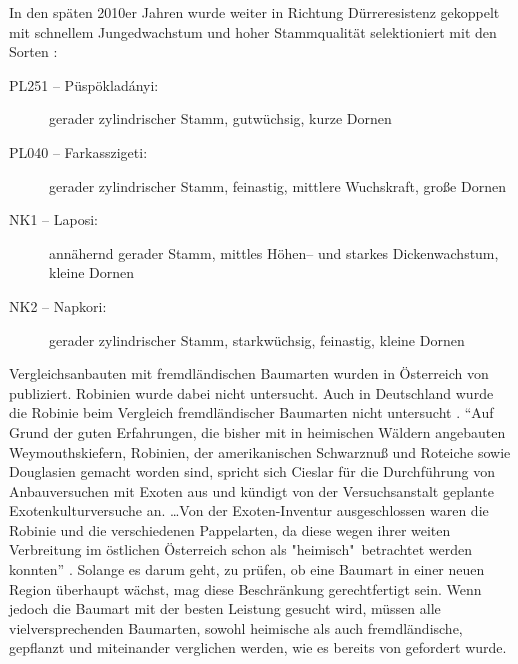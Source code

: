 \documentclass[twocolumn]{scrartcl}
\begin{document}
In den späten 2010er Jahren wurde weiter in Richtung Dürreresistenz
gekoppelt mit schnellem Jungedwachstum und hoher Stammqualität
selektioniert mit den Sorten \citep{abri2023robinieUngarn,abri2024dis}:
\begin{description}
  \item[PL251 -- Püspökladányi:] gerader zylindrischer Stamm, gutwüchsig, kurze Dornen
  \item[PL040 -- Farkasszigeti:] gerader zylindrischer Stamm, feinastig, mittlere Wuchskraft, große Dornen
  \item[NK1 -- Laposi:] annähernd gerader Stamm, mittles Höhen-- und starkes Dickenwachstum, kleine Dornen
  \item[NK2 -- Napkori:] gerader zylindrischer Stamm, starkwüchsig,
feinastig, kleine Dornen
\end{description}

Vergleichsanbauten mit fremdländischen Baumarten wurden in Österreich
von \cite{cieslar1901FremdlaendischeHolzarten} publiziert. Robinien
wurde dabei nicht untersucht. Auch in Deutschland wurde die Robinie
beim Vergleich fremdländischer Baumarten
nicht untersucht \citep{schwappach1902fremdlaendischeHolzarten}.
\enquote{Auf Grund der guten Erfahrungen, die bisher mit in heimischen
Wäldern angebauten Weymouthskiefern, Robinien, der amerikanischen
Schwarznuß und Roteiche sowie Douglasien gemacht worden sind, spricht
sich Cieslar für die Durchführung von Anbauversuchen mit Exoten aus
und kündigt von der Versuchsanstalt geplante Exotenkulturversuche
an. \dots Von der Exoten-Inventur ausgeschlossen waren die Robinie und
die verschiedenen Pappelarten, da diese wegen ihrer weiten Verbreitung
im östlichen Österreich schon als "heimisch"\ betrachtet werden
konnten} \citep{rannert1979FremdlaendischeBaumarten}. Solange es
darum geht, zu prüfen, ob eine Baumart in einer neuen Region überhaupt
wächst, mag diese Beschränkung gerechtfertigt sein.
Wenn jedoch die Baumart mit der besten Leistung gesucht wird,
müssen alle vielversprechenden Baumarten,
sowohl heimische als auch fremdländische, gepflanzt und miteinander verglichen werden,
wie es bereits von \cite{reaumur1721ertragstafel} gefordert wurde.
\end{document}
